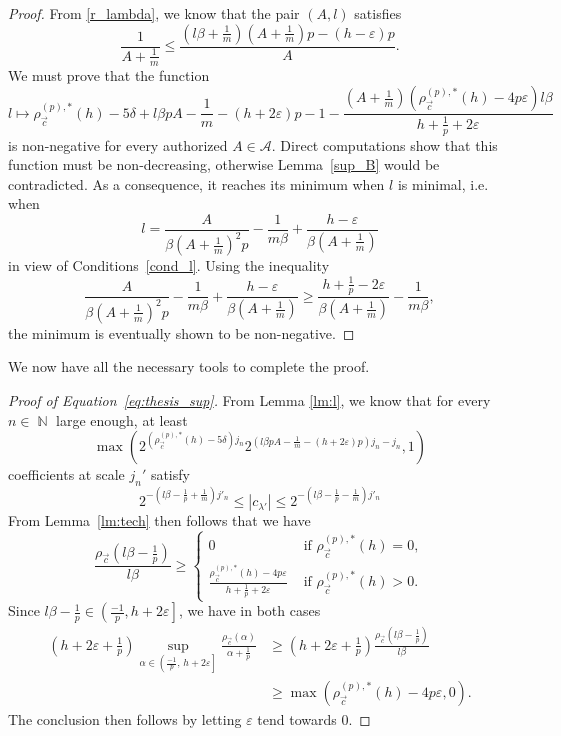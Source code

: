 \documentclass[a4paper,11pt,oneside]{article}
\DeclareMathOperator{\N}{\mathbb{N}}
\newcommand{\ocint}[1]{\left({#1}\right]}
\newcommand{\modu}[1]{\left\vert{#1}\right\vert}
\theoremstyle{definition}
\theoremstyle{plain}
\begin{document}
\begin{proof}
From \eqref{r_lambda}, we know that the pair $(A,l)$ satisfies
\begin{equation}\label{cond_l}
\frac{1}{A+\frac{1}{m}} \leq \frac{\left(l\beta+\frac{1}{m}\right)\left(A+\frac{1}{m}\right)p-(h-\varepsilon)p}{A}.
\end{equation}
We must prove that the function
\[
l\mapsto \rho_{\vec{c}}^{(p),\ast}(h)-5\delta+l\beta pA-\frac{1}{m}-(h+2\varepsilon)p-1-\frac{\left(A+\frac{1}{m}\right)(\rho_{\vec{c}}^{(p),\ast}(h)-4p\varepsilon)l\beta}{h+\frac{1}{p}+2\varepsilon}
\]
is non-negative for every authorized $A\in\mathcal{A}$. Direct computations show that this function must be non-decreasing, otherwise Lemma~\ref{sup_B} would be contradicted. As a consequence, it reaches its minimum when $l$ is minimal, i.e. when
\[
l=\frac{A}{\beta\left(A+\frac{1}{m}\right)^2p}-\frac{1}{m\beta}+\frac{h-\varepsilon}{\beta\left(A+\frac{1}{m}\right)}
\]
in view of Conditions~\eqref{cond_l}.
Using the inequality 
\[
\frac{A}{\beta\left(A+\frac{1}{m}\right)^2p}-\frac{1}{m\beta}+\frac{h-\varepsilon}{\beta\left(A+\frac{1}{m}\right)}\geq\frac{h+\frac{1}{p}-2\varepsilon}{\beta\left(A+\frac{1}{m}\right)}-\frac{1}{m\beta},
\]
the minimum is eventually shown to be non-negative.
\end{proof}

We now have all the necessary tools to complete the proof.


\begin{proof}[Proof of Equation~\ref{eq:thesis_sup}]
    From Lemma \ref{lm:l}, we know that for every $n\in\N$ large enough, at least 
    \[
    \max\left(2^{\left(\rho_{\vec{c}}^{(p),\ast}(h)-5\delta\right)j_n}2^{\left(l\beta pA-\frac{1}{m}-(h+2\varepsilon)p\right)j_n-j_n},1\right)
    \]
    coefficients at scale $j_n'$ satisfy
    \[
    2^{-\left(l\beta-\frac{1}{p}+\frac{1}{m}\right)j'_n}\leq \modu{c_{\lambda'}}\leq 2^{-\left(l\beta-\frac{1}{p}-\frac{1}{m}\right) j'_n}
    \]
    From Lemma~\ref{lm:tech} then follows that we have
    \[
    \frac{\rho_{\vec{c}}\left(l\beta-\frac{1}{p}\right)}{l\beta}\geq\left\{\begin{array}{ll}
      0   &  \text{ if } \rho_{\vec{c}}^{(p),\ast}(h)=0, \\
      \frac{\rho_{\vec{c}}^{(p),\ast}(h)-4p\varepsilon}{h+\frac{1}{p}+2\varepsilon}   & \text{ if } \rho_{\vec{c}}^{(p),\ast}(h)>0.
    \end{array}\right.
    \]
    Since $l\beta-\frac{1}{p}\in\ocint{\frac{-1}{p},h+2\varepsilon}$, we have in both cases
    \begin{align*}
    \left(h+2\varepsilon+\frac{1}{p}\right)\sup_{\alpha\in\ocint{\frac{-1}{p},\,h+2\varepsilon}}\frac{\rho_{\vec{c}}(\alpha)}{\alpha+\frac{1}{p}}
    & \geq \left(h+2\varepsilon+\frac{1}{p}\right)\frac{\rho_{\vec{c}}\left(l\beta-\frac{1}{p}\right)}{l\beta} \\
    & \geq \max(\rho_{\vec{c}}^{(p),\ast}(h)-4p\varepsilon,0).
    \end{align*}
    The conclusion then follows by letting $\varepsilon$ tend towards 0.
\end{proof}
\end{document}
